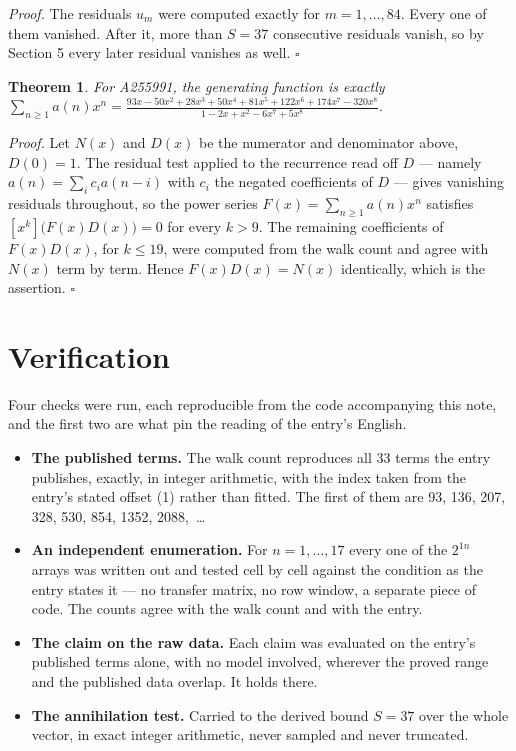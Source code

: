\documentclass[11pt]{article}
\newtheorem{theorem}{Theorem}
\theoremstyle{definition}
\begin{document}
{\itshape Proof.} The residuals $u_m$ were computed exactly for $m = 1,\dots,84$. Every one of them vanished. After it, more than $S = 37$ consecutive residuals vanish, so by Section 5 every later residual vanishes as well. $\square$

\begin{theorem} For A255991, the generating function is exactly $\sum_{n\ge 1} a(n)x^n = \frac{93x - 50x^{2} + 28x^{3} + 50x^{4} + 81x^{5} + 122x^{6} + 174x^{7} - 320x^{8}}{1 - 2x + x^{2} - 6x^{7} + 5x^{8}}$.\end{theorem}

{\itshape Proof.} Let $N(x)$ and $D(x)$ be the numerator and denominator above, $D(0)=1$. The residual test applied to the recurrence read off $D$ --- namely $a(n) = \sum_i c_i a(n-i)$ with $c_i$ the negated coefficients of $D$ --- gives vanishing residuals throughout, so the power series $F(x)=\sum_{n\ge 1}a(n)x^n$ satisfies $[x^k]\bigl(F(x)D(x)\bigr) = 0$ for every $k > 9$. The remaining coefficients of $F(x)D(x)$, for $k \le 19$, were computed from the walk count and agree with $N(x)$ term by term. Hence $F(x)D(x) = N(x)$ identically, which is the assertion. $\square$

\section{Verification}

Four checks were run, each reproducible from the code accompanying this note, and the first two are what pin the reading of the entry's English.

\begin{itemize}

\item {\bfseries The published terms.} The walk count reproduces all 33 terms the entry publishes, exactly, in integer arithmetic, with the index taken from the entry's stated offset (1) rather than fitted. The first of them are 93, 136, 207, 328, 530, 854, 1352, 2088,~\dots

\item {\bfseries An independent enumeration.} For $n = 1,\dots,17$ every one of the $2^{1n}$ arrays was written out and tested cell by cell against the condition as the entry states it --- no transfer matrix, no row window, a separate piece of code. The counts agree with the walk count and with the entry.

\item {\bfseries The claim on the raw data.} Each claim was evaluated on the entry's published terms alone, with no model involved, wherever the proved range and the published data overlap. It holds there.

\item {\bfseries The annihilation test.} Carried to the derived bound $S = 37$ over the whole vector, in exact integer arithmetic, never sampled and never truncated.

\end{itemize}
\end{document}
